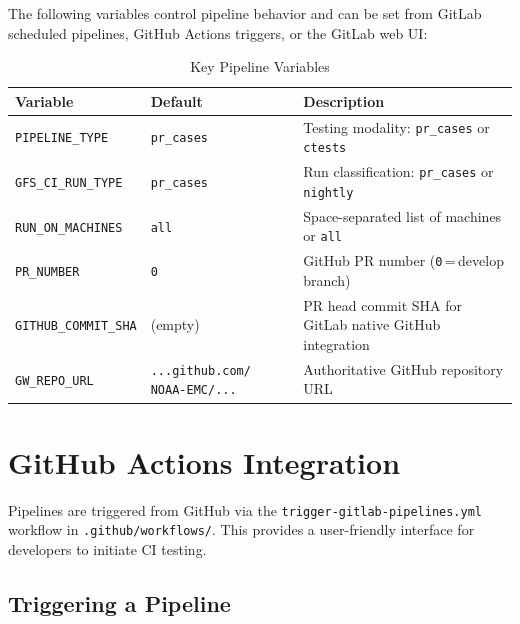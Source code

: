 \documentclass[11pt,letterpaper,twoside]{article}
\begin{document}
The following variables control pipeline behavior and can be set from GitLab
scheduled pipelines, GitHub Actions triggers, or the GitLab web UI:

\begin{table}[H]
\centering
\caption{Key Pipeline Variables}
\label{tab:pipeline-vars}
\begin{tabularx}{\linewidth}{llX}
\toprule
\textbf{Variable} & \textbf{Default} & \textbf{Description} \\
\midrule
\texttt{PIPELINE\_TYPE} & \texttt{pr\_cases} & Testing modality: \texttt{pr\_cases} or \texttt{ctests} \\
\texttt{GFS\_CI\_RUN\_TYPE} & \texttt{pr\_cases} & Run classification: \texttt{pr\_cases} or \texttt{nightly} \\
\texttt{RUN\_ON\_MACHINES} & \texttt{all} & Space-separated list of machines or \texttt{all} \\
\texttt{PR\_NUMBER} & \texttt{0} & GitHub PR number (\texttt{0}\,=\,develop branch) \\
\texttt{GITHUB\_COMMIT\_SHA} & (empty) & PR head commit SHA for GitLab native GitHub integration \\
\texttt{GW\_REPO\_URL} & \footnotesize\texttt{...github.com/ NOAA-EMC/...} & Authoritative GitHub repository URL \\
\bottomrule
\end{tabularx}
\end{table}


\section{GitHub Actions Integration}
\label{sec:github-actions}

Pipelines are triggered from GitHub via the
\texttt{trigger-gitlab-pipelines.yml} workflow in
\texttt{.github/\allowbreak{}workflows/}. This provides a user-friendly
interface for developers to initiate CI testing.

\subsection{Triggering a Pipeline}
\label{sec:triggering}
\end{document}
